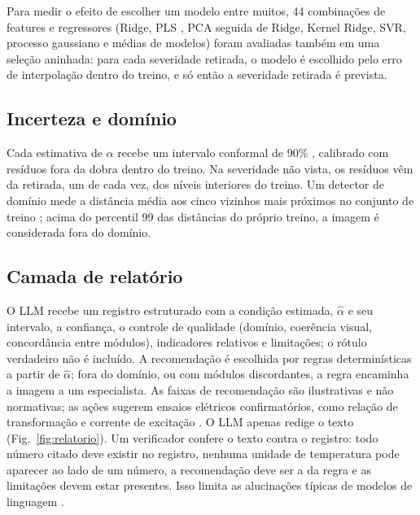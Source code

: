 \documentclass[11pt,a4paper]{article}
\begin{document}
Para medir o efeito de escolher um modelo entre muitos, 44 combinações de features e regressores (Ridge, PLS \cite{wold2001pls}, PCA seguida de Ridge, Kernel Ridge, SVR, processo gaussiano e médias de modelos) foram avaliadas também em uma seleção aninhada: para cada severidade retirada, o modelo é escolhido pelo erro de interpolação dentro do treino, e só então a severidade retirada é prevista.

\subsection{Incerteza e domínio}
Cada estimativa de $\alpha$ recebe um intervalo conformal de 90\% \cite{vovk2005,lei2018conformal,angelopoulos2021}, calibrado com resíduos fora da dobra dentro do treino. Na severidade não vista, os resíduos vêm da retirada, um de cada vez, dos níveis interiores do treino. Um detector de domínio mede a distância média aos cinco vizinhos mais próximos no conjunto de treino \cite{sun2022knn}; acima do percentil 99 das distâncias do próprio treino, a imagem é considerada fora do domínio.

\subsection{Camada de relatório}
O LLM recebe um registro estruturado com a condição estimada, $\hat\alpha$ e seu intervalo, a confiança, o controle de qualidade (domínio, coerência visual, concordância entre módulos), indicadores relativos e limitações; o rótulo verdadeiro não é incluído. A recomendação é escolhida por regras determinísticas a partir de $\hat\alpha$; fora do domínio, ou com módulos discordantes, a regra encaminha a imagem a um especialista. As faixas de recomendação são ilustrativas e não normativas; as ações sugerem ensaios elétricos confirmatórios, como relação de transformação e corrente de excitação \cite{ieeec57152}. O LLM apenas redige o texto (Fig.~\ref{fig:relatorio}). Um verificador confere o texto contra o registro: todo número citado deve existir no registro, nenhuma unidade de temperatura pode aparecer ao lado de um número, a recomendação deve ser a da regra e as limitações devem estar presentes. Isso limita as alucinações típicas de modelos de linguagem \cite{ji2023hallucination}.
\end{document}
